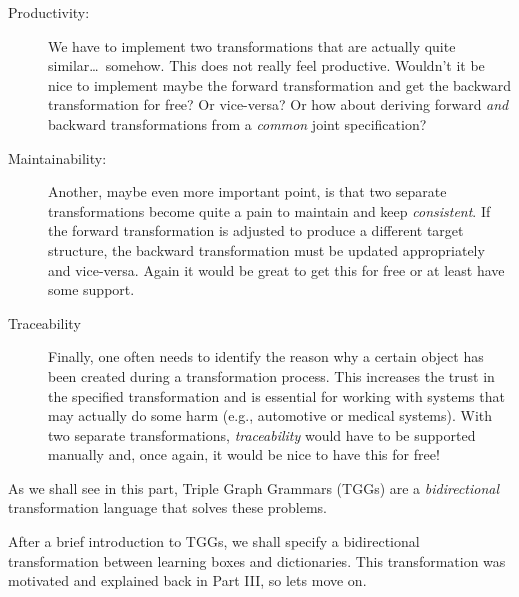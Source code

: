 \begin{description}
  \item[Productivity:] We have to implement two transformations that are actually quite similar\ldots ~somehow.  This does not really feel productive.  Wouldn't
  it be nice to implement maybe the forward transformation and get the backward transformation for free?  Or vice-versa?  Or how about deriving forward
  \emph{and} backward transformations from a \emph{common} joint specification? 
  
  \item[Maintainability:] Another, maybe even more important point, is that two
  separate transformations become quite a pain to maintain and keep \emph{consistent}.  If the forward transformation is adjusted to produce a different target
  structure, the backward transformation must be updated appropriately and vice-versa.  Again it would be great to get this for free or at least have some
  support.
  
  \item[Traceability] Finally, one often needs to identify the reason why a certain object has been created during a transformation process. This increases the
  trust in the specified transformation and is essential for working with systems that may actually do some harm (e.g., automotive or medical     
  systems). With two separate transformations, \emph{traceability} would have to be supported manually and, once again, it would be nice to have this for free!
\end{description}

As we shall see in this part, Triple Graph Grammars (TGGs) are a \emph{bidirectional} transformation language that solves these problems.

After a brief introduction to TGGs, we shall specify a bidirectional transformation between learning boxes and dictionaries. This transformation was motivated
and explained back in Part III, so lets move on.
